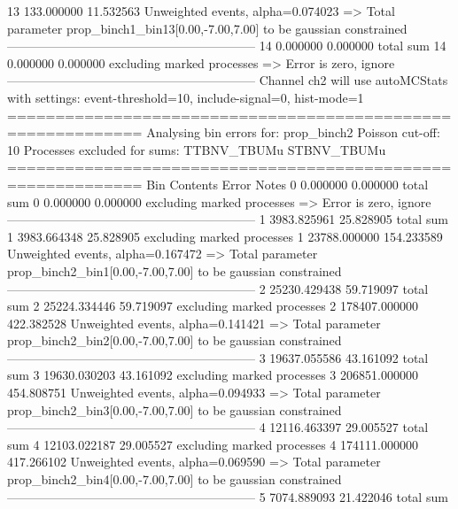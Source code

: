 13         133.000000      11.532563       Unweighted events, alpha=0.074023
  => Total parameter prop_binch1_bin13[0.00,-7.00,7.00] to be gaussian constrained
------------------------------------------------------------
14         0.000000        0.000000        total sum                     
14         0.000000        0.000000        excluding marked processes    
  => Error is zero, ignore      
------------------------------------------------------------
Channel ch2 will use autoMCStats with settings: event-threshold=10, include-signal=0, hist-mode=1
============================================================
Analysing bin errors for: prop_binch2
Poisson cut-off: 10
Processes excluded for sums: TTBNV_TBUMu STBNV_TBUMu
============================================================
Bin        Contents        Error           Notes                         
0          0.000000        0.000000        total sum                     
0          0.000000        0.000000        excluding marked processes    
  => Error is zero, ignore      
------------------------------------------------------------
1          3983.825961     25.828905       total sum                     
1          3983.664348     25.828905       excluding marked processes    
1          23788.000000    154.233589      Unweighted events, alpha=0.167472
  => Total parameter prop_binch2_bin1[0.00,-7.00,7.00] to be gaussian constrained
------------------------------------------------------------
2          25230.429438    59.719097       total sum                     
2          25224.334446    59.719097       excluding marked processes    
2          178407.000000   422.382528      Unweighted events, alpha=0.141421
  => Total parameter prop_binch2_bin2[0.00,-7.00,7.00] to be gaussian constrained
------------------------------------------------------------
3          19637.055586    43.161092       total sum                     
3          19630.030203    43.161092       excluding marked processes    
3          206851.000000   454.808751      Unweighted events, alpha=0.094933
  => Total parameter prop_binch2_bin3[0.00,-7.00,7.00] to be gaussian constrained
------------------------------------------------------------
4          12116.463397    29.005527       total sum                     
4          12103.022187    29.005527       excluding marked processes    
4          174111.000000   417.266102      Unweighted events, alpha=0.069590
  => Total parameter prop_binch2_bin4[0.00,-7.00,7.00] to be gaussian constrained
------------------------------------------------------------
5          7074.889093     21.422046       total sum                     
